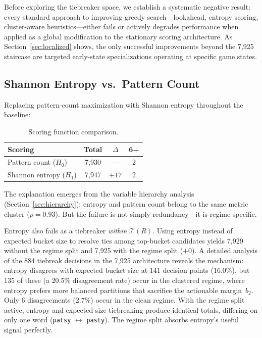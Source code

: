 \documentclass[11pt]{article}
\begin{document}
	Before exploring the tiebreaker space, we establish a systematic negative result: every standard approach to improving greedy search---lookahead, entropy scoring, cluster-aware heuristics---either fails or actively degrades performance when applied as a global modification to the stationary scoring architecture.  As Section~\ref{sec:localized} shows, the only successful improvements beyond the 7,925 staircase are targeted early-state specializations operating at specific game states.
	
	\subsection{Shannon Entropy vs.\ Pattern Count}
	
	Replacing pattern-count maximization with Shannon entropy throughout the baseline:
	
	\begin{table}[h]
		\centering
		\caption{Scoring function comparison.}
		\label{tab:scoring}
		\begin{tabular}{@{}lccc@{}}
			\toprule
			Scoring & Total & $\Delta$ & 6+ \\
			\midrule
			Pattern count ($H_0$) & 7,930 & --- & 2 \\
			Shannon entropy ($H_1$) & 7,947 & $+17$ & 2 \\
			\bottomrule
		\end{tabular}
	\end{table}
	
	The explanation emerges from the variable hierarchy analysis (Section~\ref{sec:hierarchy}): entropy and pattern count belong to the same metric cluster ($\rho = 0.93$).  But the failure is not simply redundancy---it is regime-specific.
	
	Entropy also fails as a tiebreaker \emph{within} $\mathcal{T}(R)$.  Using entropy instead of expected bucket size to resolve ties among top-bucket candidates yields 7,929 without the regime split and 7,925 with the regime split ($+0$).  A detailed analysis of the 884 tiebreak decisions in the 7,925 architecture reveals the mechanism: entropy disagrees with expected bucket size at 141 decision points (16.0\%), but 135 of these (a 20.5\% disagreement rate) occur in the clustered regime, where entropy prefers more balanced partitions that sacrifice the actionable margin~$b_2$.  Only 6 disagreements (2.7\%) occur in the clean regime.  With the regime split active, entropy and expected-size tiebreaking produce identical totals, differing on only one word (\texttt{patsy} $\leftrightarrow$ \texttt{pasty}).  The regime split absorbs entropy's useful signal perfectly.
	
\end{document}

